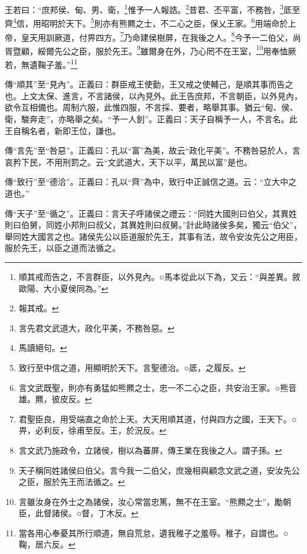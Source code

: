 王若曰：“庶邦侯、甸、男、衛，\footnote{順其戒而告之，不言群臣，以外見內。○馬本從此以下為，又云：“與差異。敘歐陽、大小夏侯同為。”}惟予一人報誥。\footnote{報其戒。}昔君、丕平富，不務咎，\footnote{言先君文武道大，政化平美，不務咎惡。}厎至齊\footnote{馬讀絕句。}信，用昭明於天下。\footnote{致行至中信之道，用顯明於天下。言聖德治。○厎，之履反。}則亦有熊羆之士，不二心之臣，保乂王家。\footnote{言文武既聖，則亦有勇猛如熊羆之士，忠一不二心之臣，共安治王家。○熊音雄。羆，彼皮反。}用端命於上帝，皇天用訓厥道，付畀四方。\footnote{君聖臣良，用受端直之命於上天。大天用順其道，付與四方之國，王天下。○畀，必利反，徐甫至反。王，於況反。}乃命建侯樹屏，在我後之人。\footnote{言文武乃施政令，立諸侯，樹以為蕃屏，傳王業在我後之人。謂子孫。}今予一二伯父，尚胥暨顧，綏爾先公之臣，服於先王。\footnote{天子稱同姓諸侯曰伯父。言今我一二伯父，庶幾相與顧念文武之道，安汝先公之臣，服於先王而法循之。}雖爾身在外，乃心罔不在王室，\footnote{言雖汝身在外士之為諸侯，汝心常當忠篤，無不在王室。“熊羆之士”，勵朝臣，此督諸侯。○督，丁木反。}用奉恤厥若，無遺鞠子羞。”\footnote{當各用心奉憂其所行順道，無自荒怠，遺我稚子之羞辱。稚子，自謂也。○鞠，居六反。}


{\noindent\zhuan{}\fzbyks 傳“順其”至“見內”。正義曰：群臣戒王使勤，王又戒之使輔己，是順其事而告之也。上文太保、進言，不言諸侯，以內見外。此王告庶邦，不言朝臣，以外見內，欲令互相備也。周制六服，此惟四服，不言採、要者，略舉其事。猶云“甸、侯、衛，駿奔走”，亦略舉之矣。“予一人釗”。正義曰：天子自稱予一人，不言名。此王自稱名者，新即王位，謙也。 \par}

{\noindent\zhuan{}\fzbyks 傳“言先”至“咎惡”。正義曰：孔以“富”為美，故云“政化平美”。不務咎惡於人，言哀矜下民，不用刑罰之。云“文武道大，天下以平，萬民以富”是也。 \par}

{\noindent\zhuan{}\fzbyks 傳“致行”至“德洽”。正義曰：孔以“齊”為中，致行中正誠信之道。云：“立大中之道也。” \par}

{\noindent\zhuan{}\fzbyks 傳“天子”至“循之”。正義曰：言天子呼諸侯之禮云：“同姓大國則曰伯父，其異姓則曰伯舅，同姓小邦則曰叔父，其異姓則曰叔舅。”計此時諸侯多矣，獨云“伯父”，舉同姓大國言之也。諸侯先公以臣道服於先王，其事有法，故令安汝先公之用臣，服於先王，以臣之道而法循之。 \par}

